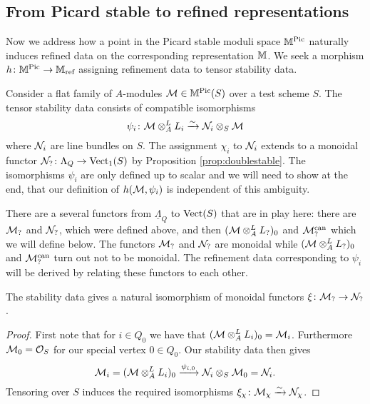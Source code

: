 \documentclass[12pt]{amsart}
\begin{document}
\subsection{From Picard stable to refined representations}
Now we address how a point in the Picard stable moduli space $\mathbb{M}^{\operatorname{Pic}}$ naturally induces refined data on the corresponding representation $\mathbb{M}$.
We seek a morphism $h \colon \mathbb{M}^{\operatorname{Pic}} \to \mathbb{M}_{\text{ref}}$ assigning refinement data to tensor stability data.

Consider a flat family of $A$-modules $\mathcal{M} \in \mathbb{M}^{\operatorname{Pic}}(S)$ over a test scheme $S$.
The tensor stability data consists of compatible isomorphisms 
$$\psi_i \colon \mathcal{M} \otimes_A^L L_i \xrightarrow{\sim} \mathcal{N}_i \otimes_S \mathcal{M}$$
where $\mathcal{N}_i$ are line bundles on $S$.
The assignment $\chi_i$ to $\mathcal{N}_i$ extends to a monoidal functor $\mathcal{N}_? \colon \Lambda_Q \rightarrow \operatorname{Vect}_1(S)$ by Proposition \ref{prop:doublestable}.
The isomorphisms $\psi_i$ are only defined up to scalar and we will need to show at the end, that our definition of $h(\mathcal{M},\psi_i)$ is independent of this ambiguity.

There are a several functors from $\underline{\Lambda}_{Q}$ to $\operatorname{Vect}(S)$ that are in play here: there are $\mathcal{M}_?$ and $\mathcal{N}_?$, which were defined above, and then $(\mathcal{M} \otimes_A^L L_?)_0$ and $\mathcal{M}_?^{\text{can}}$ which we will define below.
The functors $\mathcal{M}_?$ and $\mathcal{N}_?$ are monoidal while $(\mathcal{M} \otimes_A^L L_?)_0$ and $\mathcal{M}_?^{\text{can}}$ turn out not to be monoidal.
The refinement data corresponding to $\psi_i$ will be derived by relating these functors to each other.

\begin{lemma}\label{lm:equivNM}
The stability data gives a natural isomorphism of monoidal functors  $\xi \colon \mathcal{M}_? \rightarrow \mathcal{N}_?$.
\end{lemma}

\begin{proof}
First note that for $i\in Q_0$ we have that $(\mathcal{M} \otimes_A^L L_i)_0 = \mathcal{M}_i$.
Furthermore $\mathcal{M}_0 = \mathcal{O}_S$ for our special vertex $0\in Q_0$.
Our stability data then gives
$$\mathcal{M}_i = (\mathcal{M} \otimes_A^L L_i)_0 \xrightarrow{\psi_{i,0}} \mathcal{N}_i \otimes_S \mathcal{M}_0 = \mathcal{N}_i.$$
Tensoring over $S$ induces the required isomorphisms $\xi_\chi \colon \mathcal{M}_\chi \xrightarrow{\sim} \mathcal{N}_\chi$.
\end{proof}
\end{document}
